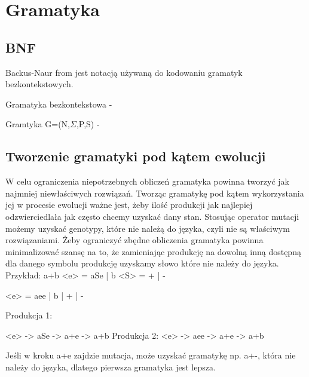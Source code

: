 
\section{Gramatyka}
\label{sec:gramatyka}
\subsection{BNF}
Backus-Naur from jest notacją używaną do kodowaniu gramatyk bezkontekstowych.

Gramatyka bezkontekstowa - 

Gramtyka G=(N,$\Sigma$,P,S) - 

\subsection{Tworzenie gramatyki pod kątem ewolucji}

W celu ograniczenia niepotrzebnych obliczeń gramatyka powinna tworzyć jak najmniej niewłaściwych rozwiązań. 
Tworząc gramatykę pod kątem wykorzystania jej w procesie ewolucji ważne jest, żeby ilość produkcji jak najlepiej odzwierciedlała jak często chcemy uzyskać dany stan.
Stosując operator mutacji możemy uzyskać genotypy, które nie należą do języka, czyli nie są właściwym rozwiązaniami. Żeby ograniczyć zbędne obliczenia gramatyka powinna minimalizować szansę na to, że zamieniając produkcję na dowolną inną dostępną dla danego symbolu produkcję uzyskamy słowo które nie należy do języka.
Przykład:
a+b
<e> = aSe | b
<S> = + | -

<e> = aee | b | + | -

Produkcja 1:

<e> -> aSe -> a+e -> a+b
Produkcja 2:
<e> -> aee -> a+e -> a+b

Jeśli w kroku a+e zajdzie mutacja, może uzyskać gramatykę np. a+-, która nie należy do języka, dlatego pierwsza gramatyka jest lepsza.